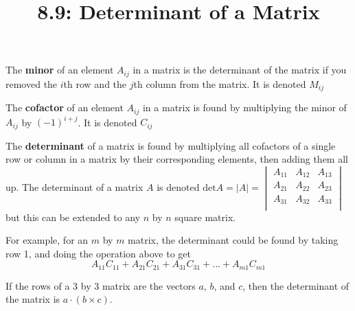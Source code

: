 \documentclass{article}
\title{8.9: Determinant of a Matrix}
\begin{document}
\maketitle

\begin{definition}[Minors]
The \textbf{minor} of an element $A_{ij}$ in a matrix is the determinant of the matrix if you removed the $i$th row and the $j$th column from the matrix. It is denoted $M_{ij}$
\end{definition}

\begin{definition}[Cofactor]
The \textbf{cofactor} of an element $A_{ij}$ in a matrix is found by multiplying the minor of $A_{ij}$ by $(-1)^{i+j}$. It is denoted $C_{ij}$
\end{definition}

\begin{definition}[Determinant]
The \textbf{determinant} of a matrix is found by multiplying all cofactors of a single row or column in a matrix by their corresponding elements, then adding them all up. The determinant of a matrix $A$ is denoted $\text{det} A = \vert A \vert = \begin{vmatrix}
    A_{11} & A_{12} & A_{13} \\ 
    A_{21} & A_{22} & A_{23} \\
    A_{31} & A_{32} & A_{33}\\
\end{vmatrix}$ but this can be extended to any $n$ by $n$ square matrix.
\end{definition}
For example, for an $m$ by $m$ matrix, the determinant could be found by taking row 1, and doing the operation above to get $$A_{11}C_{11} + A_{21}C_{21} + A_{31}C_{31} + ... + A_{m1}C_{m1}$$ 

\begin{proposition}
If the rows of a $3$ by $3$ matrix are the vectors $a$, $b$, and $c$, then the determinant of the matrix is $a \cdot (b\times c)$.
\end{proposition}
\end{document}

